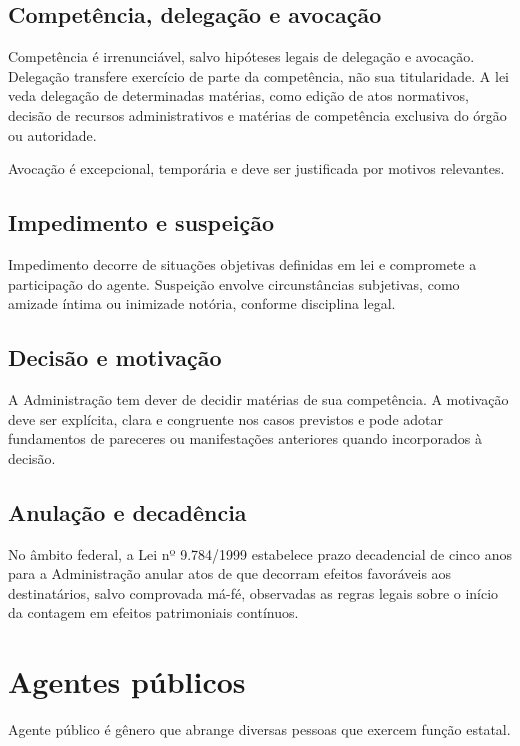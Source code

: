 \subsection{Competência, delegação e avocação}

Competência é irrenunciável, salvo hipóteses legais de delegação e avocação. Delegação transfere exercício de parte da competência, não sua titularidade. A lei veda delegação de determinadas matérias, como edição de atos normativos, decisão de recursos administrativos e matérias de competência exclusiva do órgão ou autoridade.

Avocação é excepcional, temporária e deve ser justificada por motivos relevantes.

\subsection{Impedimento e suspeição}

Impedimento decorre de situações objetivas definidas em lei e compromete a participação do agente. Suspeição envolve circunstâncias subjetivas, como amizade íntima ou inimizade notória, conforme disciplina legal.

\subsection{Decisão e motivação}

A Administração tem dever de decidir matérias de sua competência. A motivação deve ser explícita, clara e congruente nos casos previstos e pode adotar fundamentos de pareceres ou manifestações anteriores quando incorporados à decisão.

\subsection{Anulação e decadência}

No âmbito federal, a Lei nº 9.784/1999 estabelece prazo decadencial de cinco anos para a Administração anular atos de que decorram efeitos favoráveis aos destinatários, salvo comprovada má-fé, observadas as regras legais sobre o início da contagem em efeitos patrimoniais contínuos.

\section{Agentes públicos}

Agente público é gênero que abrange diversas pessoas que exercem função estatal.

